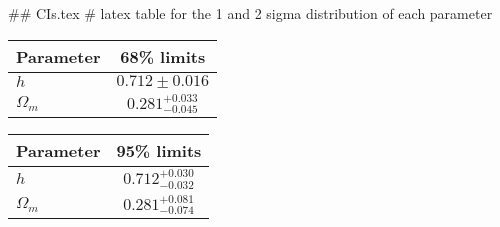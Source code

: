 ## CIs.tex
# latex table for the 1 and 2 sigma distribution of each parameter

\begin{tabular} { l  c}
 Parameter &  68\% limits\\
\hline
{\boldmath$h              $} & $0.712\pm 0.016            $\\
{\boldmath$\Omega_m       $} & $0.281^{+0.033}_{-0.045}   $\\
\hline
\end{tabular}

\begin{tabular} { l  c}
 Parameter &  95\% limits\\
\hline
{\boldmath$h              $} & $0.712^{+0.030}_{-0.032}   $\\
{\boldmath$\Omega_m       $} & $0.281^{+0.081}_{-0.074}   $\\
\hline
\end{tabular}
